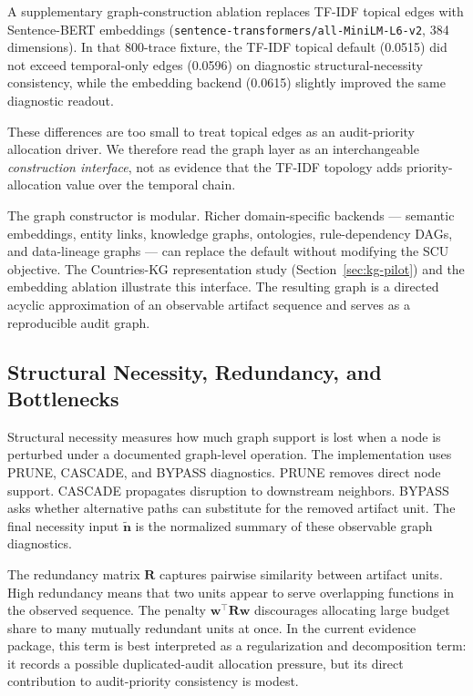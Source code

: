 \documentclass[a4paper,fleqn]{cas-sc}
\begin{document}
A supplementary graph-construction ablation replaces TF-IDF topical edges with Sentence-BERT embeddings (\texttt{sentence-transformers/all-MiniLM-L6-v2}, 384 dimensions). In that 800-trace fixture, the TF-IDF topical default (0.0515) did not exceed temporal-only edges (0.0596) on diagnostic structural-necessity consistency, while the embedding backend (0.0615) slightly improved the same diagnostic readout.

These differences are too small to treat topical edges as an audit-priority allocation driver. We therefore read the graph layer as an interchangeable \emph{construction interface}, not as evidence that the TF-IDF topology adds priority-allocation value over the temporal chain.

The graph constructor is modular. Richer domain-specific backends --- semantic embeddings, entity links, knowledge graphs, ontologies, rule-dependency DAGs, and data-lineage graphs --- can replace the default without modifying the SCU objective. The Countries-KG representation study (Section~\ref{sec:kg-pilot}) and the embedding ablation illustrate this interface. The resulting graph is a directed acyclic approximation of an observable artifact sequence and serves as a reproducible audit graph.

\subsection{Structural Necessity, Redundancy, and Bottlenecks}

Structural necessity measures how much graph support is lost when a node is perturbed under a documented graph-level operation. The implementation uses PRUNE, CASCADE, and BYPASS diagnostics. PRUNE removes direct node support. CASCADE propagates disruption to downstream neighbors. BYPASS asks whether alternative paths can substitute for the removed artifact unit. The final necessity input $\tilde{\mathbf{n}}$ is the normalized summary of these observable graph diagnostics.

The redundancy matrix $\mathbf{R}$ captures pairwise similarity between artifact units. High redundancy means that two units appear to serve overlapping functions in the observed sequence. The penalty $\mathbf{w}^{\top}\mathbf{R}\mathbf{w}$ discourages allocating large budget share to many mutually redundant units at once. In the current evidence package, this term is best interpreted as a regularization and decomposition term: it records a possible duplicated-audit allocation pressure, but its direct contribution to audit-priority consistency is modest.
\end{document}
